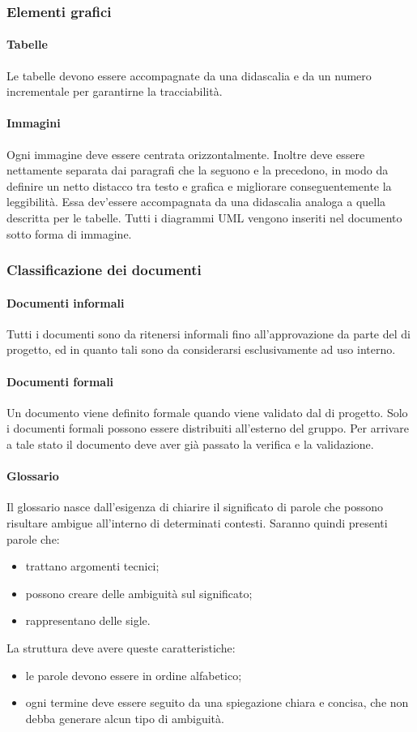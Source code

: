 \subsubsection{Elementi grafici}
 \paragraph{Tabelle} 
 Le tabelle devono essere accompagnate da una didascalia e da un numero incrementale per
garantirne la tracciabilità.
 \paragraph{Immagini}
Ogni immagine deve essere centrata orizzontalmente. Inoltre deve
essere nettamente separata dai paragrafi che la seguono e la precedono, in modo da definire un netto distacco tra testo e grafica e migliorare conseguentemente la leggibilità. Essa dev'essere accompagnata da una didascalia analoga a quella descritta per le tabelle. Tutti i diagrammi
UML vengono inseriti nel documento sotto forma di immagine.
\subsubsection{Classificazione dei documenti}
 \paragraph{Documenti informali}
 Tutti i documenti sono da ritenersi informali fino all'approvazione da parte del \RESP{} di progetto, ed in quanto tali sono da considerarsi esclusivamente ad uso interno.
 \paragraph{Documenti formali}
 Un documento viene definito formale quando viene validato dal \RESP di progetto. Solo i documenti formali possono essere distribuiti all'esterno del gruppo. Per arrivare a tale stato il
documento deve aver già passato la verifica e la validazione.
 \paragraph{Glossario}
Il glossario nasce dall'esigenza di chiarire il significato di parole che possono risultare ambigue all'interno di determinati contesti. Saranno quindi presenti parole che:
\begin{itemize}
	\item trattano argomenti tecnici;
	\item possono creare delle ambiguità sul significato;
	\item rappresentano delle sigle.
\end{itemize}
La struttura deve avere queste caratteristiche:
\begin{itemize}
	\item le parole devono essere in ordine alfabetico;
	\item ogni termine deve essere seguito da una spiegazione chiara e concisa, che non debba generare alcun tipo di ambiguità.
\end{itemize}
